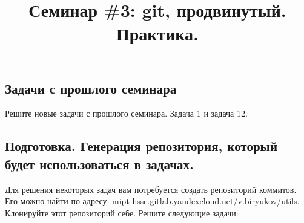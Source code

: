 \documentclass{article}
\begin{document}
\title{Семинар \#3: git, продвинутый. Практика. \vspace{-5ex}}\date{}\maketitle

\subsection*{Задачи с прошлого семинара}
Решите новые задачи с прошлого семинара. Задача 1 и задача 12.



\subsection*{Подготовка. Генерация репозитория, который будет использоваться в задачах.}

Для решения некоторых задач вам потребуется создать репозиторий коммитов. 
Его можно найти по адресу:
\href{https://mipt-hsse.gitlab.yandexcloud.net/v.biryukov/utils}{mipt-hsse.gitlab.yandexcloud.net/v.biryukov/utils}. Клонируйте этот репозиторий себе. Решите следующие задачи:
\end{document}
